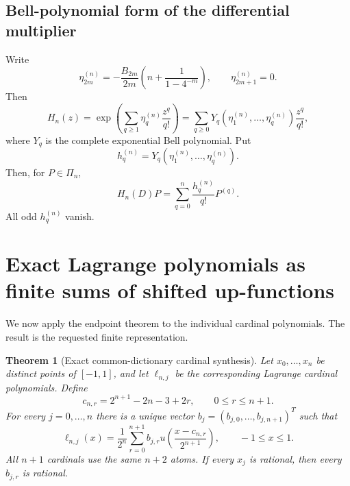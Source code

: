 \documentclass[11pt,oneside]{article}
\newtheorem{theorem}{Theorem}[section]
\theoremstyle{definition}
\theoremstyle{remark}
\newcommand{\1}{\mathbf{1}}
\begin{document}
\subsection{Bell-polynomial form of the differential multiplier}

Write
\begin{equation}
 \eta^{(n)}_{2m}
 =-\frac{B_{2m}}{2m}
 \left(n+\frac1{1-4^{-m}}\right),
 \qquad
 \eta^{(n)}_{2m+1}=0.
 \label{eq:eta}
\end{equation}
Then
\[
 H_n(z)=\exp\!\left(\sum_{q\ge1}\eta_q^{(n)}\frac{z^q}{q!}\right)
 =\sum_{q\ge0}Y_q\!\left(\eta_1^{(n)},\ldots,\eta_q^{(n)}\right)
 \frac{z^q}{q!},
\]
where $Y_q$ is the complete exponential Bell polynomial.  Put
\begin{equation}
 h_q^{(n)}=Y_q\!\left(\eta_1^{(n)},\ldots,\eta_q^{(n)}\right).
 \label{eq:hBell}
\end{equation}
Then, for $P\in\Pi_n$,
\begin{equation}
 H_n(D)P=\sum_{q=0}^n\frac{h_q^{(n)}}{q!}P^{(q)}.
 \label{eq:HDP}
\end{equation}
All odd $h_q^{(n)}$ vanish.

\section{Exact Lagrange polynomials as finite sums of shifted up-functions}
\label{sec:cardinal-main}

We now apply the endpoint theorem to the individual cardinal polynomials.
The result is the requested finite representation.

\begin{theorem}[Exact common-dictionary cardinal synthesis]
\label{thm:cardinal-synth}
Let $x_0,\ldots,x_n$ be distinct points of $[-1,1]$, and let
$\ell_{n,j}$ be the corresponding Lagrange cardinal polynomials.  Define
\begin{equation}
 c_{n,r}=2^{n+1}-2n-3+2r,
 \qquad 0\le r\le n+1.
 \label{eq:centers-x}
\end{equation}
For every $j=0,\ldots,n$ there is a unique vector
$b_j=(b_{j,0},\ldots,b_{j,n+1})^T$ such that
\begin{equation}
 \boxed{
 \ell_{n,j}(x)=\frac1{2^n}\sum_{r=0}^{n+1}b_{j,r}
 u\!\left(\frac{x-c_{n,r}}{2^{n+1}}\right),
 \qquad -1\le x\le1.}
 \label{eq:cardinal-up}
\end{equation}
All $n+1$ cardinals use the same $n+2$ atoms.  If every $x_j$ is rational,
then every $b_{j,r}$ is rational.
\end{theorem}
\end{document}
